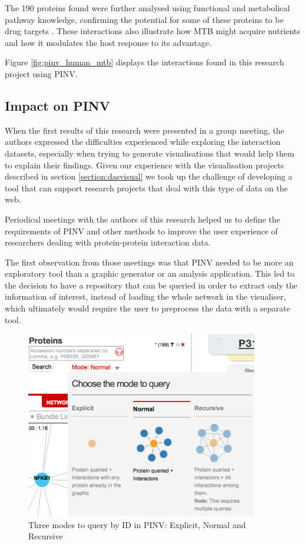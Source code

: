 The 190 proteins found were further analysed using functional and metabolical pathway knowledge, confirming the potential for some of these proteins to be drug targets \cite{RAP2013}. These interactions also illustrate how MTB might acquire nutrients and how it modulates the host response to its advantage.

Figure \ref{fig:pinv_human_mtb} displays the interactions found in this research project using PINV.


\subsection{Impact on PINV}

When the first results of this research were presented in a group meeting, the authors expressed the difficulties experienced while exploring the interaction datasets, especially when trying to generate visualisations that would help them to explain their findings. Given our experience with the visualisation projects described in section \ref{section:dasvisual} we took up the challenge of developing a tool that can support research projects that deal with this type of data on the web. 

Periodical meetings with the authors of this research helped us to define the requirements of PINV and other methods to improve the user experience of researchers dealing with protein-protein interaction data. 

The first observation from those meetings was that PINV needed to be more an exploratory tool than a graphic generator or an analysis application. This led to the decision to have a repository that can be queried in order to extract only the information of interest, instead of loading the whole network in the visualiser, which ultimately would require the user to preprocess the data with a separate tool.

\begin{figure}
\centering
\includegraphics[width=4in]{figures/pinv_modes_query.png}
\caption[Three modes to query by ID in PINV]{Three modes to query by ID in PINV: Explicit, Normal and Recursive
\label{fig:pinv_modes_query}}
\end{figure}

